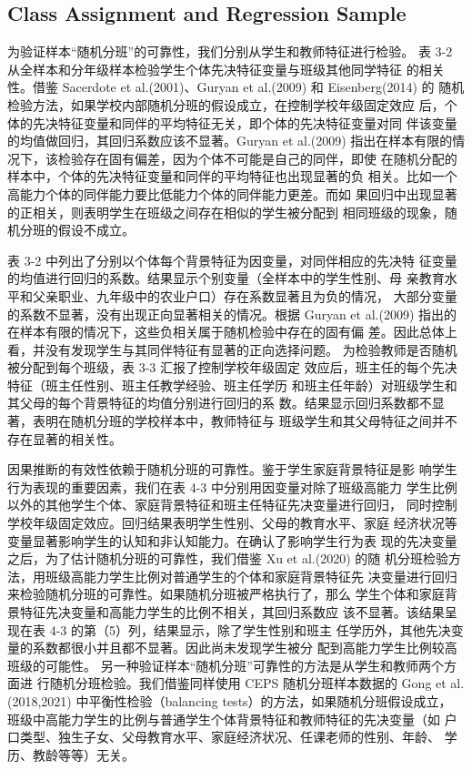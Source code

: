 \subsection{Class Assignment and Regression Sample}

为验证样本“随机分班”的可靠性，我们分别从学生和教师特征进行检验。 表 3-2 从全样本和分年级样本检验学生个体先决特征变量与班级其他同学特征 的相关性。借鉴 Sacerdote et al.(2001)、Guryan et al.(2009) 和 Eisenberg(2014) 的 随机检验方法，如果学校内部随机分班的假设成立，在控制学校年级固定效应 后，个体的先决特征变量和同伴的平均特征无关，即个体的先决特征变量对同 伴该变量的均值做回归，其回归系数应该不显著。Guryan et al.(2009) 指出在样本有限的情况下，该检验存在固有偏差，因为个体不可能是自己的同伴，即使 在随机分配的样本中，个体的先决特征变量和同伴的平均特征也出现显著的负 相关。比如一个高能力个体的同伴能力要比低能力个体的同伴能力更差。而如 果回归中出现显著的正相关，则表明学生在班级之间存在相似的学生被分配到 相同班级的现象，随机分班的假设不成立。

表 3-2 中列出了分别以个体每个背景特征为因变量，对同伴相应的先决特 征变量的均值进行回归的系数。结果显示个别变量（全样本中的学生性别、母 亲教育水平和父亲职业、九年级中的农业户口）存在系数显著且为负的情况， 大部分变量的系数不显著，没有出现正向显著相关的情况。根据 Guryan et al.(2009) 指出的在样本有限的情况下，这些负相关属于随机检验中存在的固有偏 差。因此总体上看，并没有发现学生与其同伴特征有显著的正向选择问题。 为检验教师是否随机被分配到每个班级，表 3-3 汇报了控制学校年级固定 效应后，班主任的每个先决特征（班主任性别、班主任教学经验、班主任学历 和班主任年龄）对班级学生和其父母的每个背景特征的均值分别进行回归的系 数。结果显示回归系数都不显著，表明在随机分班的学校样本中，教师特征与 班级学生和其父母特征之间并不存在显著的相关性。


因果推断的有效性依赖于随机分班的可靠性。鉴于学生家庭背景特征是影 响学生行为表现的重要因素，我们在表 4-3 中分别用因变量对除了班级高能力 学生比例以外的其他学生个体、家庭背景特征和班主任特征先决变量进行回归， 同时控制学校年级固定效应。回归结果表明学生性别、父母的教育水平、家庭 经济状况等变量显著影响学生的认知和非认知能力。在确认了影响学生行为表 现的先决变量之后，为了估计随机分班的可靠性，我们借鉴 Xu et al.(2020) 的随 机分班检验方法，用班级高能力学生比例对普通学生的个体和家庭背景特征先 决变量进行回归来检验随机分班的可靠性。如果随机分班被严格执行了，那么 学生个体和家庭背景特征先决变量和高能力学生的比例不相关，其回归系数应 该不显著。该结果呈现在表 4-3 的第（5）列，结果显示，除了学生性别和班主 任学历外，其他先决变量的系数都很小并且都不显著。因此尚未发现学生被分 配到高能力学生比例较高班级的可能性。 另一种验证样本“随机分班”可靠性的方法是从学生和教师两个方面进 行随机分班检验。我们借鉴同样使用 CEPS 随机分班样本数据的 Gong et al. (2018,2021) 中平衡性检验（balancing tests）的方法，如果随机分班假设成立， 班级中高能力学生的比例与普通学生个体背景特征和教师特征的先决变量（如 户口类型、独生子女、父母教育水平、家庭经济状况、任课老师的性别、年龄、 学历、教龄等等）无关。


